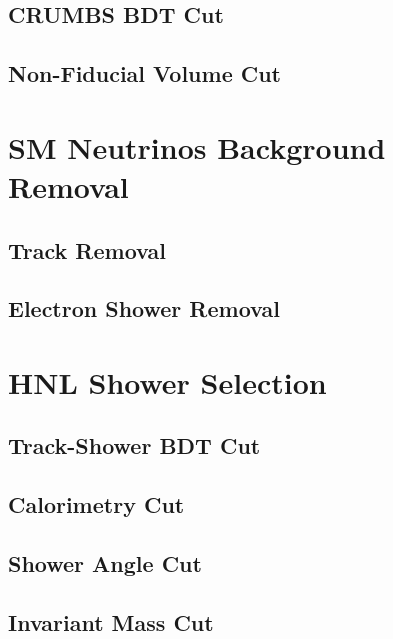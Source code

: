 \subsection{CRUMBS BDT Cut}

\subsection{Non-Fiducial Volume Cut}

\section{SM Neutrinos Background Removal}

\subsection{Track Removal}

\subsection{Electron Shower Removal}


\section{HNL Shower Selection}
\label{sec:hnl_shower_select}

\subsection{Track-Shower BDT Cut}

\subsection{Calorimetry Cut}

\subsection{Shower Angle Cut}

\subsection{Invariant Mass Cut}

